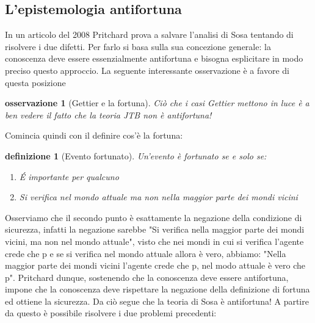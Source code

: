 \documentclass[10pt,a4paper]{article}
\newtheorem{osservazione}{osservazione}
\newtheorem{definizione}{definizione}
\begin{document}
\subsection{L'epistemologia antifortuna}
In un articolo del 2008 Pritchard prova a salvare l'analisi di Sosa tentando di risolvere i due difetti. Per farlo si basa sulla sua concezione generale: la conoscenza deve essere essenzialmente antifortuna e bisogna esplicitare in modo preciso questo approccio. La seguente interessante osservazione è a favore di questa posizione
\begin{osservazione}[Gettier e la fortuna]
	Ciò che i casi Gettier mettono in luce è a ben vedere il fatto che la teoria JTB non è antifortuna!
\end{osservazione}
Comincia quindi con il definire cos'è la fortuna:
\begin{definizione}[Evento fortunato]
 Un'evento è fortunato se e solo se:
\begin{enumerate}
	\item \'E importante per qualcuno
	\item Si verifica nel mondo attuale ma non nella maggior parte dei mondi vicini
\end{enumerate}
\end{definizione}
Osserviamo che il secondo punto è esattamente la negazione della condizione di sicurezza, infatti la negazione sarebbe "Si verifica nella maggior parte dei mondi vicini, ma non nel mondo attuale", visto che nei mondi in cui si verifica l'agente crede che p e se si verifica nel mondo attuale allora è vero, abbiamo: "Nella maggior parte dei mondi vicini l'agente crede che p, nel modo attuale è vero che p". Pritchard dunque, sostenendo che la conoscenza deve essere antifortuna, impone che la conoscenza deve rispettare la negazione della definizione di fortuna ed ottiene la sicurezza. Da ciò segue che la teoria di Sosa è antifortuna! 
A partire da questo è possibile risolvere i due problemi precedenti:
\end{document}
